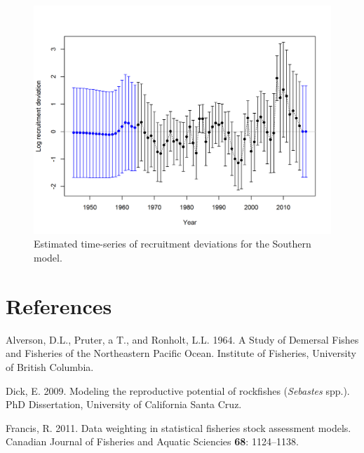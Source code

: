 \documentclass[12pt,]{article}
\begin{document}
\begin{figure}[htbp]
\centering
\includegraphics{r4ss/plots_mod2/recdevs2_withbars.png}
\caption{Estimated time-series of recruitment deviations for the
Southern model. \label{fig:recdevs2}}
\end{figure}

\FloatBarrier

\FloatBarrier

\FloatBarrier

\FloatBarrier

\FloatBarrier

\newpage

\color{black}

\section*{References}\label{references}

\renewcommand{\thepage}{}


\hypertarget{refs}{}
\hypertarget{ref-Alverson1964}{}
Alverson, D.L., Pruter, a T., and Ronholt, L.L. 1964. A Study of
Demersal Fishes and Fisheries of the Northeastern Pacific Ocean.
Institute of Fisheries, University of British Columbia.

\hypertarget{ref-Dick2009}{}
Dick, E. 2009. Modeling the reproductive potential of rockfishes
(\emph{Sebastes} spp.). PhD Dissertation, University of California Santa
Cruz.

\hypertarget{ref-Francis2011}{}
Francis, R. 2011. Data weighting in statistical fisheries stock
assessment models. Canadian Journal of Fisheries and Aquatic Sciencies
\textbf{68}: 1124--1138.
\end{document}
